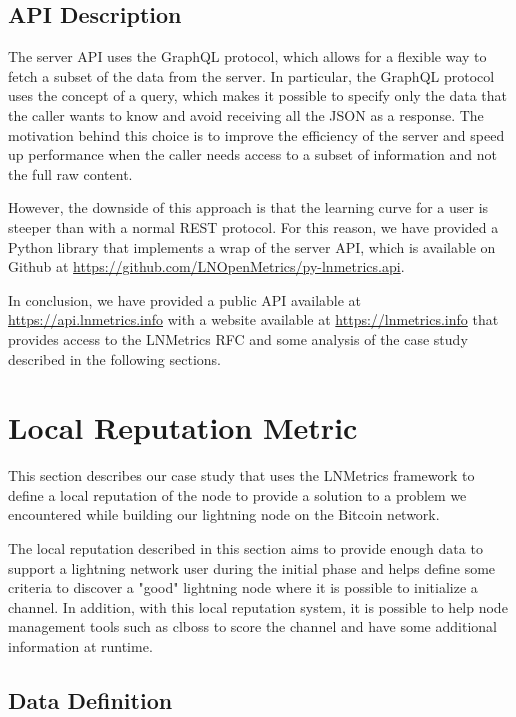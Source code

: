 \subsection{API Description}

The server API uses the GraphQL protocol, which allows for a flexible way 
to fetch a subset of the data from the server. In particular, the GraphQL 
protocol uses the concept of a query, which makes it possible to specify 
only the data that the caller wants to know and avoid receiving all the JSON 
as a response. The motivation behind this choice is to improve the efficiency 
of the server and speed up performance when the caller needs access to a subset
of information and not the full raw content.

However, the downside of this approach is that the learning curve for a user 
is steeper than with a normal REST protocol. For this reason, we have provided
a Python library that implements a wrap of the server API, which is available
on Github at \url{https://github.com/LNOpenMetrics/py-lnmetrics.api}.

In conclusion, we have provided a public API available at \url{https://api.lnmetrics.info} 
with a website available at \url{https://lnmetrics.info} that provides access to the 
LNMetrics RFC and some analysis of the case study described in the 
following sections.

\section{Local Reputation Metric}
\label{sec:demo}

This section describes our case study that uses the LNMetrics framework 
to define a local reputation of the node to provide a solution to a
problem we encountered while building our lightning node on the
Bitcoin network.

The local reputation described in this section aims to provide enough 
data to support a lightning network user during the initial phase and
helps define some criteria to discover a "good" lightning node where 
it is possible to initialize a channel. In addition, with this local 
reputation system, it is possible to help node management tools such as
clboss \cite{clboss} to score the channel and have some additional 
information at runtime.


\subsection{Data Definition}
\label{sec:data_definition_datadef}


